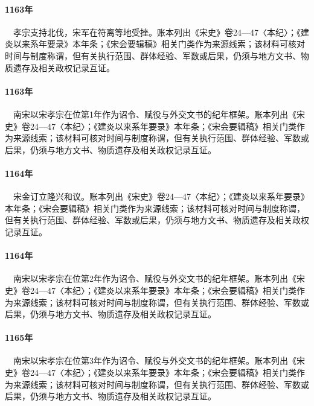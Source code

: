 \paragraph{1163年}　孝宗支持北伐，宋军在符离等地受挫。账本列出《宋史》卷24—47〈本纪〉；《建炎以来系年要录》本年条；《宋会要辑稿》相关门类作为来源线索；该材料可核对时间与制度称谓，但有关执行范围、群体经验、军数或后果，仍须与地方文书、物质遗存及相关政权记录互证。

\paragraph{1163年}　南宋以宋孝宗在位第1年作为诏令、赋役与外交文书的纪年框架。账本列出《宋史》卷24—47〈本纪〉；《建炎以来系年要录》本年条；《宋会要辑稿》相关门类作为来源线索；该材料可核对时间与制度称谓，但有关执行范围、群体经验、军数或后果，仍须与地方文书、物质遗存及相关政权记录互证。

\paragraph{1164年}　宋金订立隆兴和议。账本列出《宋史》卷24—47〈本纪〉；《建炎以来系年要录》本年条；《宋会要辑稿》相关门类作为来源线索；该材料可核对时间与制度称谓，但有关执行范围、群体经验、军数或后果，仍须与地方文书、物质遗存及相关政权记录互证。

\paragraph{1164年}　南宋以宋孝宗在位第2年作为诏令、赋役与外交文书的纪年框架。账本列出《宋史》卷24—47〈本纪〉；《建炎以来系年要录》本年条；《宋会要辑稿》相关门类作为来源线索；该材料可核对时间与制度称谓，但有关执行范围、群体经验、军数或后果，仍须与地方文书、物质遗存及相关政权记录互证。

\paragraph{1165年}　南宋以宋孝宗在位第3年作为诏令、赋役与外交文书的纪年框架。账本列出《宋史》卷24—47〈本纪〉；《建炎以来系年要录》本年条；《宋会要辑稿》相关门类作为来源线索；该材料可核对时间与制度称谓，但有关执行范围、群体经验、军数或后果，仍须与地方文书、物质遗存及相关政权记录互证。

